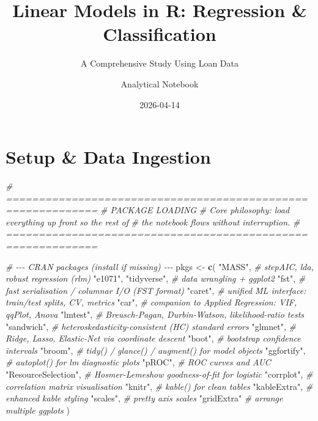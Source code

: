 \documentclass[
]{article}
\title{Linear Models in R: Regression \& Classification}
\subtitle{A Comprehensive Study Using Loan Data}
\author{Analytical Notebook}
\date{2026-04-14}
\newenvironment{Shaded}{\begin{snugshade}}{\end{snugshade}}
\newcommand{\CommentTok}[1]{\textcolor[rgb]{0.56,0.35,0.01}{\textit{#1}}}
\newcommand{\FunctionTok}[1]{\textcolor[rgb]{0.13,0.29,0.53}{\textbf{#1}}}
\newcommand{\NormalTok}[1]{#1}
\newcommand{\OtherTok}[1]{\textcolor[rgb]{0.56,0.35,0.01}{#1}}
\newcommand{\StringTok}[1]{\textcolor[rgb]{0.31,0.60,0.02}{#1}}
\begin{document}
\maketitle

{
\setcounter{tocdepth}{3}
\tableofcontents
}
\section{Setup \& Data Ingestion}\label{setup-data-ingestion}

\begin{Shaded}
\begin{Highlighting}[]
\CommentTok{\# ============================================================}
\CommentTok{\#  PACKAGE LOADING}
\CommentTok{\#  Core philosophy: load everything up front so the rest of}
\CommentTok{\#  the notebook flows without interruption.}
\CommentTok{\# ============================================================}

\CommentTok{\# {-}{-}{-} CRAN packages (install if missing) {-}{-}{-}}
\NormalTok{pkgs }\OtherTok{\textless{}{-}} \FunctionTok{c}\NormalTok{(}
  \StringTok{"MASS"}\NormalTok{,         }\CommentTok{\# stepAIC, lda, robust regression (rlm)}
  \StringTok{"e1071"}\NormalTok{,}
  \StringTok{"tidyverse"}\NormalTok{,    }\CommentTok{\# data wrangling + ggplot2}
  \StringTok{"fst"}\NormalTok{,          }\CommentTok{\# fast serialisation / columnar I/O (FST format)}
  \StringTok{"caret"}\NormalTok{,        }\CommentTok{\# unified ML interface: train/test splits, CV, metrics}
  \StringTok{"car"}\NormalTok{,          }\CommentTok{\# companion to Applied Regression: VIF, qqPlot, Anova}
  \StringTok{"lmtest"}\NormalTok{,       }\CommentTok{\# Breusch{-}Pagan, Durbin{-}Watson, likelihood{-}ratio tests}
  \StringTok{"sandwich"}\NormalTok{,     }\CommentTok{\# heteroskedasticity{-}consistent (HC) standard errors}
  \StringTok{"glmnet"}\NormalTok{,       }\CommentTok{\# Ridge, Lasso, Elastic{-}Net via coordinate descent}
  \StringTok{"boot"}\NormalTok{,         }\CommentTok{\# bootstrap confidence intervals}
  \StringTok{"broom"}\NormalTok{,        }\CommentTok{\# tidy() / glance() / augment() for model objects}
  \StringTok{"ggfortify"}\NormalTok{,    }\CommentTok{\# autoplot() for lm diagnostic plots}
  \StringTok{"pROC"}\NormalTok{,         }\CommentTok{\# ROC curves and AUC}
  \StringTok{"ResourceSelection"}\NormalTok{, }\CommentTok{\# Hosmer{-}Lemeshow goodness{-}of{-}fit for logistic}
  \StringTok{"corrplot"}\NormalTok{,     }\CommentTok{\# correlation matrix visualisation}
  \StringTok{"knitr"}\NormalTok{,        }\CommentTok{\# kable() for clean tables}
  \StringTok{"kableExtra"}\NormalTok{,   }\CommentTok{\# enhanced kable styling}
  \StringTok{"scales"}\NormalTok{,       }\CommentTok{\# pretty axis scales}
  \StringTok{"gridExtra"}     \CommentTok{\# arrange multiple ggplots}
\NormalTok{)}


\end{Highlighting}
\end{Shaded}
\end{document}
